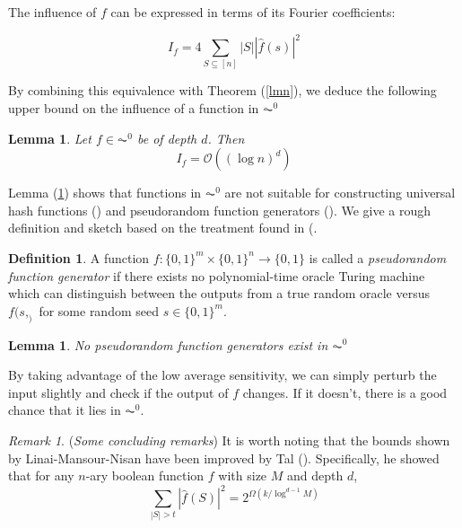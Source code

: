 \documentclass{amsart}
\newtheorem{lemma}[theorem]{Lemma}
\theoremstyle{definition}
\newtheorem{definition}[theorem]{Definition}
\theoremstyle{remark}
\newtheorem{remark}[theorem]{Remark}
\numberwithin{equation}{section}
\theoremstyle{remark}
\begin{document}
The influence of $f$ can be expressed in terms of its Fourier coefficients:

\begin{equation}
  I_f = 4\sum_{S \subseteq [n]} |S||\hat{f}(s)|^2
\end{equation}

By combining this equivalence with Theorem (\ref{lmn}), we deduce the following upper bound on the influence of a function in $\AC^0$

\begin{lemma} \label{influence}
  Let $f \in \AC^0$ be of depth $d$. Then
  \begin{equation}
    I_f = \mathcal{O}((\log n)^d)
  \end{equation}
\end{lemma}

Lemma (\ref{influence}) shows that functions in $\AC^0$  are not suitable for constructing universal hash functions (\cite{mansour}) and pseudorandom function generators (\cite{lmn}). We give a rough definition and sketch based on the treatment found in (\cite{lmn}.

\begin{definition}
  A function $f:\{0,1\}^m \times \{0,1\}^n \rightarrow \{0,1\}$ is called a \emph{pseudorandom function generator} if there exists no polynomial-time oracle Turing machine which can distinguish between the outputs from a true random oracle versus $f(s,_)$ for some random seed $s \in \{0,1\}^m$.
\end{definition}

\begin{lemma}
  No pseudorandom function generators exist in $\AC^0$
\end{lemma}
By taking advantage of the low average sensitivity, we can simply perturb the input slightly and check if the output of $f$ changes. If it doesn't, there is a good chance that
it lies in $\AC^0$.

\begin{remark}{(\emph{Some concluding remarks})}
  It is worth noting that the bounds shown by Linai-Mansour-Nisan have been improved by Tal (\cite{tal}). Specifically, he showed that for any $n$-ary boolean function $f$ with size $M$ and depth $d$,\
  \begin{equation}
    \sum_{|S| > t} |\hat{f}(S)|^2 = 2^{\Omega(k/\log^{d-1}{M})}
  \end{equation}
\end{remark}


\end{document}
